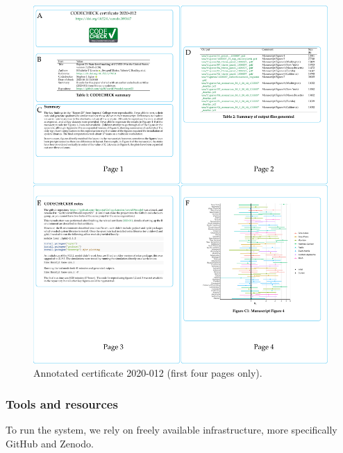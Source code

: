 \documentclass[12pt]{article}
\begin{document}
\begin{figure}
  \centering
  \includegraphics[width=\textwidth]{figs/annotate-cert-crop.pdf}
  \caption{Annotated certificate 2020-012 \cite{cert-2020-012} (first four pages only).}
  \label{fig:cert}
\end{figure}

\subsubsection*{Tools and resources}\label{tools}

To run the system, we rely on freely available infrastructure, more 
specifically GitHub and Zenodo.
\end{document}
